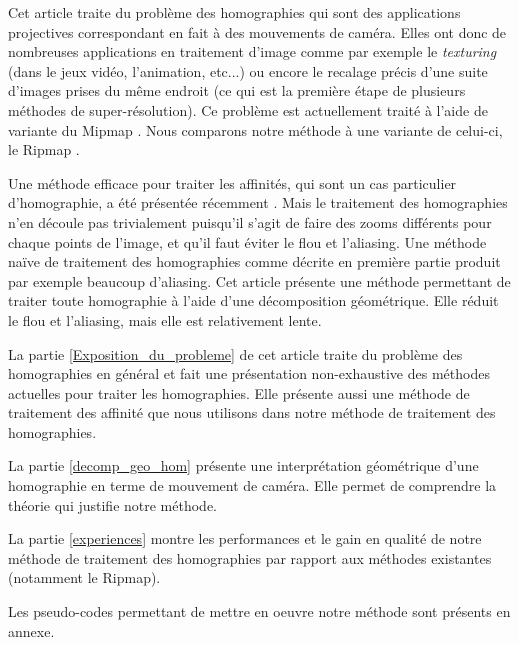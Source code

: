 	Cet article traite du problème des homographies qui sont des applications projectives correspondant en fait à des mouvements de caméra. Elles ont donc de nombreuses applications en traitement d'image comme par exemple le \emph{texturing} \cite{heckbert1983texture} (dans le jeux vidéo, l'animation, etc...) ou encore le recalage précis d'une suite d'images prises du même endroit \cite{brown2007automatic} (ce qui est la première étape de plusieurs méthodes de super-résolution). Ce problème est actuellement traité à l'aide de variante du Mipmap \cite{williams1983pyramidal}. Nous comparons notre méthode à une variante de celui-ci, le Ripmap \cite{akenine2008real}.

	Une méthode efficace pour traiter les affinités, qui sont un cas particulier d'homographie, a été présentée récemment \cite{szeliski2010high}. Mais le traitement des homographies n'en découle pas trivialement puisqu'il s'agit de faire des zooms différents pour chaque points de l'image, et qu'il faut éviter le flou et l'aliasing. Une méthode naïve de traitement des homographies comme décrite en première partie produit par exemple beaucoup d'aliasing. Cet article présente une méthode permettant de traiter toute homographie à l'aide d'une décomposition géométrique. Elle réduit le flou et l'aliasing, mais elle est relativement lente.

	La partie \ref{Exposition_du_probleme} de cet article traite du problème des homographies en général et fait une présentation non-exhaustive des méthodes actuelles pour traiter les homographies. Elle présente aussi une méthode de traitement des affinité que nous utilisons dans notre méthode de traitement des homographies. 

	La partie \ref{decomp_geo_hom} présente une interprétation géométrique d'une homographie en terme de mouvement de caméra. Elle permet de comprendre la théorie qui justifie notre méthode.

	La partie \ref{experiences} montre les performances et le gain en qualité de notre méthode de traitement des homographies par rapport aux méthodes existantes (notamment le Ripmap).

	Les pseudo-codes permettant de mettre en oeuvre notre méthode sont présents en annexe.

